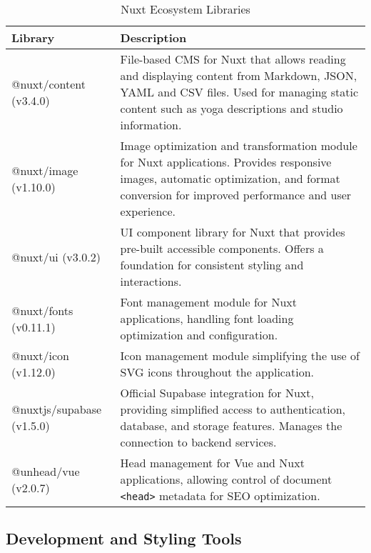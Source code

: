 \begin{table}[H]
    \centering
    \setlength{\tabcolsep}{5pt}
    \renewcommand{\arraystretch}{1.2} 
    \begin{tabular}{|p{3.5cm}|p{10.8cm}|}
        \hline
        \rowcolor{bluepoli!20}
        \textbf{Library} & \textbf{Description} \\
        \hline
        @nuxt/content (v3.4.0) & File-based CMS for Nuxt that allows reading and displaying content from Markdown, JSON, YAML and CSV files. Used for managing static content such as yoga descriptions and studio information. \\
        \hline
        @nuxt/image (v1.10.0) & Image optimization and transformation module for Nuxt applications. Provides responsive images, automatic optimization, and format conversion for improved performance and user experience. \\
        \hline
        @nuxt/ui (v3.0.2) & UI component library for Nuxt that provides pre-built accessible components. Offers a foundation for consistent styling and interactions. \\
        \hline
        @nuxt/fonts (v0.11.1) & Font management module for Nuxt applications, handling font loading optimization and configuration. \\
        \hline
        @nuxt/icon (v1.12.0) & Icon management module simplifying the use of SVG icons throughout the application. \\
        \hline 
        @nuxtjs/supabase (v1.5.0) & Official Supabase integration for Nuxt, providing simplified access to authentication, database, and storage features. Manages the connection to backend services. \\
        \hline
        @unhead/vue (v2.0.7) & Head management for Vue and Nuxt applications, allowing control of document \texttt{<head>} metadata for SEO optimization. \\
        \hline
    \end{tabular}
    \caption{Nuxt Ecosystem Libraries}
\end{table}

\subsection{Development and Styling Tools}

